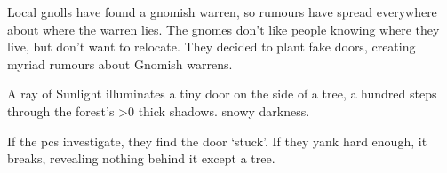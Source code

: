 
\ifodd\year

  Local gnolls have found a gnomish warren, so rumours have spread everywhere about where the warren lies.
  The gnomes don't like people knowing where they live, but don't want to relocate.
  They decided to plant fake doors, creating myriad rumours about Gnomish warrens.

  \begin{boxtext}
    A ray of Sunlight illuminates a tiny door on the side of a tree, a hundred \glspl{step} through the forest's
    \ifnum\value{temperature}>0%
      thick shadows.
    \else
      snowy darkness.
    \fi
  \end{boxtext}

  If the \glspl{pc} investigate, they find the door `stuck'.
  If they yank hard enough, it breaks, revealing nothing behind it except a tree.

\fi

